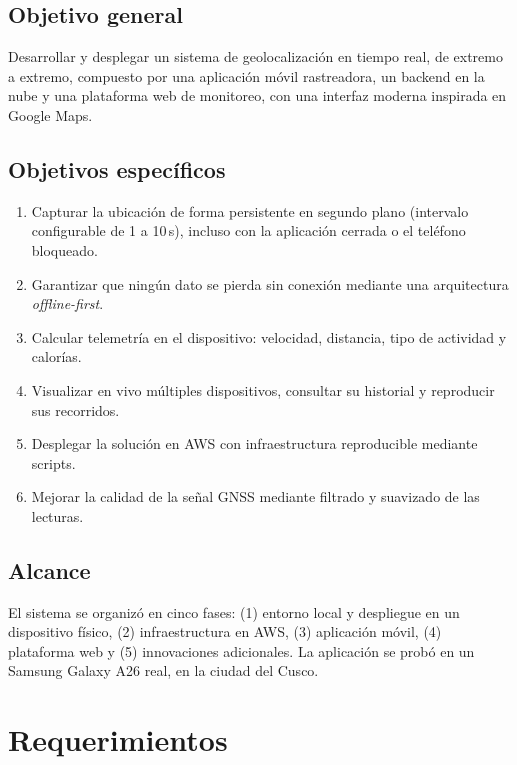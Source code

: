\documentclass[11pt]{article}
\begin{document}
\subsection{Objetivo general}
Desarrollar y desplegar un sistema de geolocalización en tiempo real, de extremo a extremo, compuesto por
una aplicación móvil rastreadora, un backend en la nube y una plataforma web de monitoreo, con una
interfaz moderna inspirada en Google Maps.

\subsection{Objetivos específicos}
\begin{enumerate}
  \item Capturar la ubicación de forma persistente en segundo plano (intervalo configurable de 1 a 10\,s),
        incluso con la aplicación cerrada o el teléfono bloqueado.
  \item Garantizar que ningún dato se pierda sin conexión mediante una arquitectura \emph{offline-first}.
  \item Calcular telemetría en el dispositivo: velocidad, distancia, tipo de actividad y calorías.
  \item Visualizar en vivo múltiples dispositivos, consultar su historial y reproducir sus recorridos.
  \item Desplegar la solución en AWS con infraestructura reproducible mediante scripts.
  \item Mejorar la calidad de la señal GNSS mediante filtrado y suavizado de las lecturas.
\end{enumerate}

\subsection{Alcance}
El sistema se organizó en cinco fases: (1) entorno local y despliegue en un dispositivo físico,
(2) infraestructura en AWS, (3) aplicación móvil, (4) plataforma web y (5) innovaciones adicionales.
La aplicación se probó en un Samsung Galaxy A26 real, en la ciudad del Cusco.

\section{Requerimientos}
\end{document}
